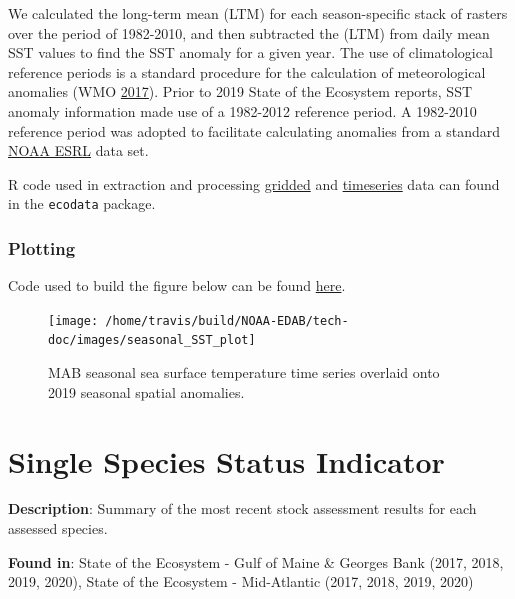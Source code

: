 \documentclass[
]{book}
\begin{document}
We calculated the long-term mean (LTM) for each season-specific stack of rasters over the period of 1982-2010, and then subtracted the (LTM) from daily mean SST values to find the SST anomaly for a given year. The use of climatological reference periods is a standard procedure for the calculation of meteorological anomalies (WMO \protect\hyperlink{ref-WMO2017}{2017}). Prior to 2019 State of the Ecosystem reports, SST anomaly information made use of a 1982-2012 reference period. A 1982-2010 reference period was adopted to facilitate calculating anomalies from a standard \href{https://www.esrl.noaa.gov/psd/data/gridded/data.noaa.oisst.v2.highres.html}{NOAA ESRL} data set.

R code used in extraction and processing \href{https://github.com/NOAA-EDAB/ecodata/blob/master/data-raw/get_seasonal_oisst_anom_gridded.R}{gridded} and \href{https://github.com/NOAA-EDAB/ecodata/blob/master/data-raw/get_seasonal_oisst_anom.R}{timeseries} data can found in the \texttt{ecodata} package.

\hypertarget{plotting-27}{%
\subsection{Plotting}\label{plotting-27}}

Code used to build the figure below can be found \href{https://github.com/NOAA-EDAB/ecodata/blob/master/chunk-scripts/LTL.Rmd-MAB-SST-insitu.R}{here}.

\begin{figure}

{\centering \texttt{[image: /home/travis/build/NOAA-EDAB/tech-doc/images/seasonal\_SST\_plot]} 

}

\caption{MAB seasonal sea surface temperature time series overlaid onto 2019 seasonal spatial anomalies.}\label{fig:MAB-SST}
\end{figure}

\hypertarget{stockstatus}{%
\chapter{Single Species Status Indicator}\label{stockstatus}}

\textbf{Description}: Summary of the most recent stock assessment results for each assessed species.

\textbf{Found in}: State of the Ecosystem - Gulf of Maine \& Georges Bank (2017, 2018, 2019, 2020), State of the Ecosystem - Mid-Atlantic (2017, 2018, 2019, 2020)
\end{document}
